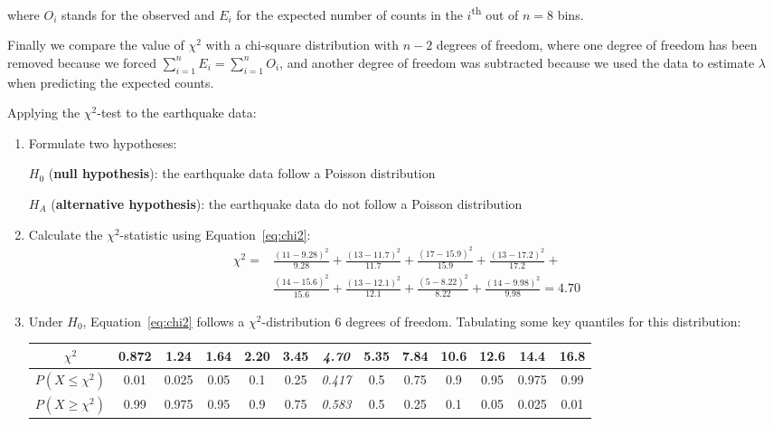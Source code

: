 \noindent where $O_i$ stands for the observed and $E_i$ for the
expected number of counts in the $i$\textsuperscript{th} out of $n=8$
bins.\medskip

Finally we compare the value of $\chi^2$ with a chi-square
distribution with $n-2$ degrees of freedom, where one degree of
freedom has been removed because we forced
$\sum_{i=1}^nE_i=\sum_{i=1}^nO_i$, and another degree of freedom was
subtracted because we used the data to estimate $\lambda$ when
predicting the expected counts.\medskip

Applying the $\chi^2$-test to the earthquake data:

\begin{enumerate}
\item  Formulate two hypotheses:

  $H_0$ (\textbf{null hypothesis}):
  the earthquake data follow a Poisson distribution

  $H_{\!A}$ (\textbf{alternative hypothesis}):
  the earthquake data do not follow a Poisson distribution
  
\item Calculate the $\chi^2$-statistic using Equation~\ref{eq:chi2}:
  \begin{equation}
    \begin{split}
      \chi^2 = &
      \frac{(11-9.28)^2}{9.28} + \frac{(13-11.7)^2}{11.7} +
      \frac{(17-15.9)^2}{15.9} + \frac{(13-17.2)^2}{17.2} + \\
      & \frac{(14-15.6)^2}{15.6} + \frac{(13-12.1)^2}{12.1} +
      \frac{(5-8.22)^2}{8.22} + \frac{(14-9.98)^2}{9.98} = 4.70
    \end{split}
  \end{equation}

\item Under $H_0$, Equation~\ref{eq:chi2} follows a
  $\chi^2$-distribution 6 degrees of freedom. Tabulating some key
  quantiles for this distribution:

  \begin{center}
    \begin{tabular}{c|c@{\gap}c@{\gap}c@{\gap}c@{\gap}
        c@{\gap}c@{\gap}c@{\gap}c@{\gap}c@{\gap}c@{\gap}c@{\gap}c}
      $\chi^2$ & 0.872 & 1.24 & 1.64 & 2.20 & 3.45 & \textit{4.70} &
      5.35 & 7.84 & 10.6 & 12.6 & 14.4 & 16.8 \\ \hline
      $P(X\leq{\chi^2})$ & 0.01 & 0.025 & 0.05 & 0.1 & 0.25 &
      \textit{0.417} & 0.5 & 0.75 & 0.9 & 0.95 & 0.975 & 0.99 \\
      $P(X\geq{\chi^2})$ & 0.99 & 0.975 & 0.95 & 0.9 & 0.75 &
      \textit{0.583} & 0.5 & 0.25 & 0.1 & 0.05 & 0.025 & 0.01
    \end{tabular}
  \end{center}


\end{enumerate}
